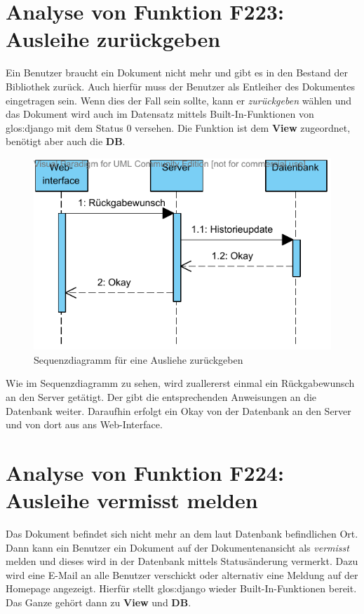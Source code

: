 \section{Analyse von Funktion F223: Ausleihe zurückgeben}
\label{f:223}
Ein Benutzer braucht ein Dokument nicht mehr und gibt es in den Bestand der 
Bibliothek zurück. Auch hierfür muss der Benutzer als Entleiher des Dokumentes 
eingetragen sein. Wenn dies der Fall sein sollte, kann er \emph{zurückgeben} 
wählen und das Dokument wird auch im Datensatz mittels Built-In-Funktionen von 
\gls{glos:django} mit dem Status 0 versehen. Die Funktion ist dem \textbf{View} 
zugeordnet, benötigt aber auch die \textbf{DB}.

\begin{figure}[H]
\begin{center}
\includegraphics[width=0.6\linewidth]{bilder/seq-zurueck.pdf}
\caption{Sequenzdiagramm für eine Ausliehe zurückgeben}
\label{fig:223}
\end{center}
\end{figure}
Wie im Sequenzdiagramm zu sehen, wird zuallererst einmal ein Rückgabewunsch an den Server getätigt. Der gibt die entsprechenden Anweisungen an die Datenbank weiter. Daraufhin erfolgt ein Okay von der Datenbank an den Server und von dort aus ans Web-Interface.

\section{Analyse von Funktion F224: Ausleihe vermisst melden}
\label{f:224}
Das Dokument befindet sich nicht mehr an dem laut Datenbank befindlichen Ort. 
Dann kann ein Benutzer ein Dokument auf der Dokumentenansicht als 
\emph{vermisst} melden und dieses wird in der Datenbank mittels Statusänderung 
vermerkt. Dazu wird eine E-Mail an alle Benutzer verschickt oder alternativ eine
Meldung auf der Homepage angezeigt. Hierfür stellt \gls{glos:django} wieder 
Built-In-Funktionen bereit. Das Ganze gehört dann zu \textbf{View} und 
\textbf{DB}.

